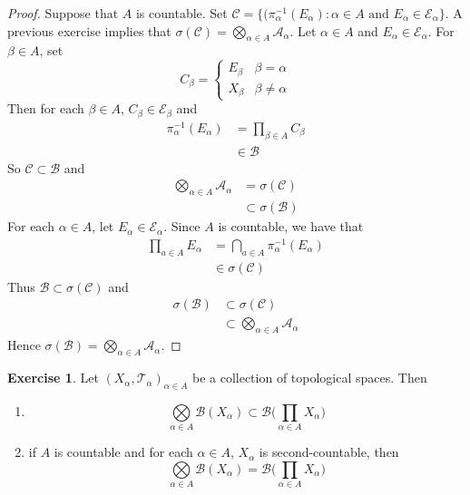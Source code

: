 \documentclass[12pt]{amsart}
\theoremstyle{definition}
\newtheorem{ex}[definition]{Exercise}
\newcommand{\al}{\alpha}
\newcommand{\be}{\beta}
\newcommand{\sig}{\sigma}
\newcommand{\MA}{\mathcal{A}}
\newcommand{\MC}{\mathcal{C}}
\newcommand{\MB}{\mathcal{B}}
\newcommand{\ME}{\mathcal{E}}
\newcommand{\MT}{\mathcal{T}}
\begin{document}
 	\begin{proof}
 		Suppose that $A$ is countable. Set $\MC =  \bigg \{ (\pi_{\al}^{-1}(E_{\al}): \al \in A \text{ and }E_{\al} \in \ME_{\al} \bigg \}$. A previous exercise implies that $\sig(\MC) = \bigotimes\limits_{\al \in A} \MA_{\al}$. Let $\al \in A$ and $E_{\al} \in \ME_{\al}$. For $\be \in A$, set 
 		\[
 		C_{\be} = 
 		\begin{cases}
 			E_{\be} & \be = \al \\
 			X_{\be} & \be \neq \al
 		\end{cases}
 		\]
 		Then for each $\beta \in A$, $C_{\be} \in \ME_{\be}$ and
 		\begin{align*}
 			\pi_{\al}^{-1}(E_{\al}) 
 			& = \prod_{\be \in A} C_{\be} \\
 			& \in \MB
 		\end{align*}
 		So $\MC \subset \MB$ and 
 		\begin{align*}
 			\bigotimes\limits_{\al \in A} \MA_{\al}
 			& = \sig(\MC) \\
 			& \subset \sig(\MB)
 		\end{align*}
 		For each $\al \in A$, let $E_{\al} \in \ME_{\al}$. Since $A$ is countable, we have that 
 		\begin{align*}
 			\prod_{a \in A} E_{\al} 
 			& = \bigcap_{a \in A} \pi_{\al}^{-1}(E_{\al}) \\
 			& \in \sig(\MC) 
 		\end{align*}
 		Thus $\MB \subset \sig(\MC)$ and 
 		\begin{align*}
 			\sig(\MB)
 			& \subset \sig(\MC) \\ 
 			& \subset \bigotimes\limits_{\al \in A} \MA_{\al} 
 		\end{align*}
 		Hence $\sig(\MB) = \bigotimes\limits_{\al \in A} \MA_{\al}$.
 	\end{proof}
 
 	\begin{ex}
 		Let $(X_{\al}, \MT_{\al})_{\al \in A}$ be a collection of topological spaces. Then 
 		\begin{enumerate}
 			\item $$\bigotimes\limits_{\al \in A}  \MB(X_{\al}) \subset \MB \bigg( \prod_{\al \in A} X_{\al} \bigg)$$
 			\item if $A$ is countable and for each $\al \in A$, $X_{\al}$ is second-countable, then $$\bigotimes\limits_{\al \in A}  \MB(X_{\al}) = \MB \bigg( \prod_{\al \in A} X_{\al} \bigg)$$
 		\end{enumerate}
 	\end{ex}
 
\end{document}
